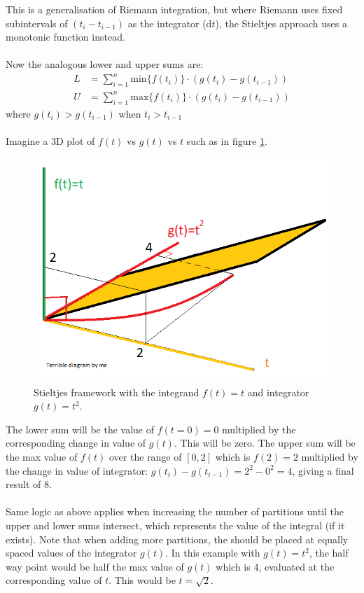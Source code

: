 \documentclass[12pt]{article}
\begin{document}
This is a generalisation of Riemann integration, but where Riemann uses fixed subintervals of $(t_i-t_{i-1})$ as the integrator (d$t$), the Stieltjes approach uses a monotonic function instead.\\
\\
Now the analogous lower and upper sums are:
\begin{eqnarray}
	L &= \sum_{i=1}^{n}\mathrm{min}\{f(t_i)\}\cdot(g(t_i)-g(t_{i-1}))\\
	U &= \sum_{i=1}^{n}\mathrm{max}\{f(t_i)\}\cdot(g(t_i)-g(t_{i-1}))
\end{eqnarray}
\noindent where $g(t_i)>g(t_{i-1})$ when $t_i>t_{i-1}$\\
\\
Imagine a 3D plot of $f(t)$ vs $g(t)$ vs $t$ such as in  figure \ref{fig:stieltjesIntegration}.
\begin{figure}[h!]
	\centering
	\includegraphics[width=0.8\linewidth]{stieltjesIntegration.png}
	\caption{Stieltjes framework with the integrand $f(t)=t$ and integrator $g(t)=t^2$.}
	\label{fig:stieltjesIntegration}
\end{figure}

\noindent The lower sum will be the value of $f(t=0)=0$ multiplied by the corresponding change in value of $g(t)$. This will be zero. The upper sum will be the max value of $f(t)$ over the range of $[0,2]$ which is $f(2)=2$ multiplied by the change in value of integrator: $g(t_i)-g(t_{i-1})=2^2 - 0^2=4$, giving a final result of 8.\\
\\
Same logic as above applies when increasing the number of partitions until the upper and lower sums intersect, which represents the value of the integral (if it exists). Note that when adding more partitions, the should be placed at equally spaced values of the integrator $g(t)$. In this example with $g(t)=t^2$, the half way point would be half the max value of $g(t)$ which is 4, evaluated at the corresponding value of $t$. This would be $t=\sqrt{2}$.
\end{document}
